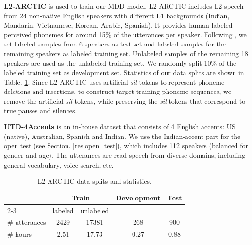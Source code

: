 \documentclass[a4paper]{article}
\begin{document}
\textbf{L2-ARCTIC} \cite{zhao18b_interspeech} is used to train our MDD model. L2-ARCTIC includes L2 speech from 24 non-native English speakers with different L1 backgrounds (Indian, Mandarin, Vietnamese, Korean, Arabic, Spanish). It provides human-labeled perceived phonemes for around 15\% of the utterances per speaker. Following \cite{peng21e_interspeech, feng2020sed}, we set labeled samples from 6 speakers as test set and labeled samples for the remaining speakers as labeled training set. Unlabeled samples of the remaining 18 speakers are used as the unlabeled training set. We randomly split 10\% of the labeled training set as development set. Statistics of our data splits are shown in Table. \ref{tab:data}. Since L2-ARCTIC uses artificial \textit{sil} tokens to represent phoneme deletions and insertions, to construct target training phoneme sequences, we remove the artificial \textit{sil} tokens, while preserving the \textit{sil} tokens that correspond to true pauses and silences. 

\noindent\textbf{UTD-4Accents} \cite{ghorbani18_interspeech} is an in-house dataset that consists of 4 English accents: US (native), Australian, Spanish and Indian. We use the Indian-accent part for the open test (see Section. \ref{res:open_test}), which includes 112 speakers (balanced for gender and age). The utterances are read speech from diverse domains, including general vocabulary, voice search, etc.


\begin{table}[b]
    \centering
    \vspace{-2mm}
    \caption{L2-ARCTIC data splits and statistics.} \label{tab:data}
    \vspace{-1mm}
    \begin{tabular}{l|cc|c|c}
    \hline
                  & \multicolumn{2}{c|}{Train} & \multirow{2}{*}{Development} & \multirow{2}{*}{Test} \\ \cline{2-3}
                  & labeled     & unlabeled    &                      &                       \\ \hline
    \# utterances & 2429        & 17381        & 268                  & 900                   \\
    \# hours      & 2.51        & 17.73        & 0.27                 & 0.88                  \\ \hline
    \end{tabular}
    
\end{table}
\end{document}
